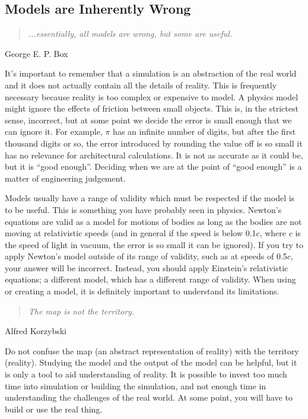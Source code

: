 \subsection*{Models are Inherently Wrong}
\begin{quote}
\textit{...essentially, all models are wrong, but some are useful.}
\end{quote}
\hfill George E. P. Box

It's important to remember that a simulation is an abstraction of the real world and it does not actually contain all the details of reality. This is frequently necessary because reality is too complex or expensive to model. A physics model might ignore the effects of friction between small objects. This is, in the strictest sense, incorrect, but at some point we decide the error is small enough that we can ignore it. For example, $\pi$ has an infinite number of digits, but after the first thousand digits or so, the error introduced by rounding the value off is so small it has no relevance for architectural calculations. It is not as accurate as it could be, but it is ``good enough''. Deciding when we are at the point of ``good enough'' is a matter of engineering judgement.

Models usually have a range of validity which must be respected if the model is to be useful. This is something you have probably seen in physics. Newton's equations are valid as a model for motions of bodies as long as the bodies are not moving at relativistic speeds (and in general if the speed is below 0.1$c$, where $c$ is the speed of light in vacuum, the error is so small it can be ignored). If you try to apply Newton's model outside of its range of validity, such as at speeds of 0.5$c$, your answer will be incorrect. Instead, you should apply Einstein's relativistic equations; a different model, which has a different range of validity. When using or creating a model, it is definitely important to understand its limitations.

\begin{quote}
\textit{The map is not the territory.}
\end{quote}
\hfill Alfred Korzybski

Do not confuse the map (an abstract representation of reality) with the territory (reality). Studying the model and the output of the model can be helpful, but it is only a tool to aid understanding of reality. It is possible to invest too much time into simulation or building the simulation, and not enough time in understanding the challenges of the real world. At some point, you will have to build or use the real thing. 

